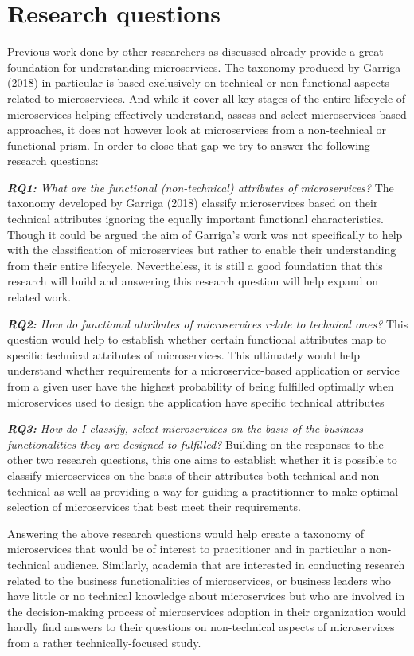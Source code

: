 \documentclass{article}
\begin{document}
\section{Research questions}

Previous work done by other researchers as discussed already provide a great foundation for understanding microservices. The taxonomy produced by Garriga (2018) in particular is based exclusively on technical or non-functional aspects related to microservices. And while it cover all key stages of the entire lifecycle of microservices helping effectively understand, assess and select microservices based approaches, it does not however look at microservices from a non-technical or functional prism. In order to close that gap we try to answer the following research questions:

\textit{\textbf{RQ1:} What are the functional (non-technical) attributes of microservices?} The taxonomy developed by Garriga (2018) classify microservices based on their technical attributes ignoring the equally important functional characteristics. Though it could be argued the aim of Garriga's work was not specifically to help with the classification of microservices but rather to enable their understanding from their entire lifecycle. Nevertheless, it is still a good foundation that this research will build and answering this research question will help expand on related work. 

\textit{\textbf{RQ2:} How do functional attributes of microservices relate to technical ones?} This question would help to establish whether certain functional attributes map to specific technical attributes of microservices. This ultimately would help understand whether requirements for a microservice-based application or service from a given user have the highest probability of being fulfilled optimally when microservices used to design the application have specific technical attributes

\textit{\textbf{RQ3:} How do I classify, select microservices on the basis of the business functionalities they are designed to fulfilled?} Building on the responses to the other two research questions, this one aims to establish whether it is possible to classify microservices on the basis of their attributes both technical and non technical as well as providing a way for guiding a practitionner to make optimal selection of microservices that best meet their requirements.

Answering the above research questions would help create a taxonomy of microservices that would be of interest to practitioner and in particular a non-technical audience. Similarly, academia that are interested in conducting research related to the business functionalities of microservices, or business leaders who have little or no technical knowledge about microservices but who are involved in the decision-making process of microservices adoption in their organization would hardly find answers to their questions on non-technical aspects of microservices from a rather technically-focused study.
\end{document}
